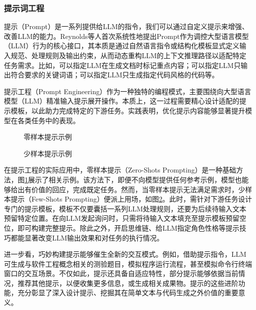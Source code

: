 \documentclass[UTF8,a4paper,12pt]{ctexart}
\numberwithin{equation}{section}
\begin{document}
\subsubsection{提示词工程}
提示（Prompt）是一系列提供给LLM的指令，我们可以通过自定义提示来增强、改善LLM的能力。Reynolds等人首次系统性地提出Prompt作为调控大型语言模型（LLM）行为的核心接口，其本质是通过自然语言指令或结构化模板显式定义输入规范、处理规则及输出约束，从而动态重构LLM的上下文推理路径以适配特定任务需求。比如，可以指定LLM在生成文档时标记重点内容；可以指定LLM只输出符合要求的关键词语；可以指定LLM只生成指定代码风格的代码等。\par
提示工程（Prompt Engineering）作为一种独特的编程模式，主要围绕向大型语言模型（LLM）精准输入提示展开操作。本质上，这一过程需要精心设计适配的提示模板，以此助力完成特定的下游任务。实践表明，优化提示内容能够显著提升模型在各类任务中的表现。\par
\begin{figure}[H]
	\caption{零样本提示示例}
	\label{zero_shot}
\end{figure}
\begin{figure}[H]
	\caption{少样本提示示例}
	\label{few_shot}
\end{figure}
在提示工程的实际应用中，零样本提示（Zero-Shots Prompting）是一种基础方法，图\ref{zero_shot}展示了相关示例。该方法下，即便不向模型提供任何参考示例，模型也能够给出有价值的回应，完成既定任务。然而，当零样本提示无法满足需求时，少样本提示（Few-Shots Prompting）便派上用场，如图\ref{few_shot}。此时，需针对下游任务设计专门的提示模板，模板不仅要囊括一系列LLM处理规则，还要为后续待输入文本预留特定位置。在向LLM发起询问时，只需将待输入文本填充至提示模板预留空位，即可构建完整提示。除此之外，开启思维链、给LLM指定角色性格等提示技巧都能显著改变LLM输出效果和对任务的执行情况。\par
进一步看，巧妙构建提示能够催生全新的交互模式。例如，借助提示指令，LLM可生成与软件工程概念相关的测验题目，模拟程序运行流程，甚至模拟命令行终端窗口的交互场景。不仅如此，提示还具备自适应特性，部分提示能够依据当前情况，推荐其他提示，以便收集更多信息，或生成相关成果物。提示的这些进阶功能，充分彰显了深入设计提示、挖掘其在简单文本与代码生成之外价值的重要意义。 
\end{document}
